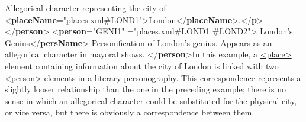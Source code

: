 \begin{reflist}
\begin{sansreflist}
\begin{reflist}
\mbox{}\newline 
\hspace*{1em}Allegorical character representing the city of {<\textbf{placeName}\hspace*{1em}{ref}="{places.xml\#LOND1}">}London{</\textbf{placeName}>}.{</\textbf{p}>}\mbox{}\newline 
{}\mbox{}\newline 
{</\textbf{person}>}\mbox{}\newline 
{<\textbf{person}\hspace*{1em}{xml:id}="{GENI1}"\mbox{}\newline 
\hspace*{1em}{corresp}="{places.xml\#LOND1 \#LOND2}">}\mbox{}\newline 
{}London’s Genius{</\textbf{persName}>}\mbox{}\newline 
{}\mbox{}\newline 
\hspace*{1em}Personification of London’s genius. Appears as an\mbox{}\newline 
\hspace*{1em}\hspace*{1em}\hspace*{1em}\hspace*{1em} allegorical character in mayoral shows.\mbox{}\newline 
\hspace*{1em}\mbox{}\newline 
{}\mbox{}\newline 
{</\textbf{person}>}In this example, a \hyperref[TEI.place]{<place>} element containing information about the city of London is linked with two \hyperref[TEI.person]{<person>} elements in a literary personography. This correspondence represents a slightly looser relationship than the one in the preceding example; there is no sense in which an allegorical character could be substituted for the physical city, or vice versa, but there is obviously a correspondence between them.

\end{reflist}
\end{sansreflist}
\end{reflist}
